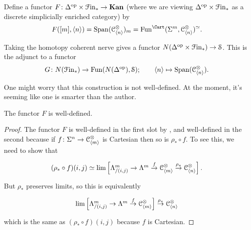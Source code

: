\documentclass[main.tex]{subfiles}
\begin{document}
\begin{definition}
  Define a functor $F\colon \Delta^{\mathrm{op}} \times \mathcal{F}\mathrm{in}_{*} \to \mathbf{Kan}$ (where we are viewing $\Delta^{\mathrm{op}} \times \mathcal{F}\mathrm{in}_{*}$ as a discrete simplicially enriched category) by
  \begin{equation*}
    F([m], \langle n \rangle) = \Span(\category{C}^{\otimes}_{\langle n \rangle})_{m} = \Fun^{\Cart}(\Sig^{m}, \category{C}^{\otimes}_{\langle n \rangle})^{\simeq}.
  \end{equation*}

  Taking the homotopy coherent nerve gives a functor $N(\Delta^{\mathrm{op}} \times \mathcal{F}\mathrm{in}_{*}) \to \mathcal{S}$. This is the adjunct to a functor
  \begin{equation*}
    G\colon N(\mathcal{F}\mathrm{in}_{*}) \to \mathrm{Fun}(N(\Delta^{\mathrm{op}}), \mathcal{S});\qquad \langle n \rangle \mapsto \mathrm{Span}(\mathcal{C}^{\otimes}_{\langle n \rangle}).
  \end{equation*}
\end{definition}

One might worry that this construction is not well-defined. At the moment, it's seeming like one is smarter than the author.

\begin{lemma}
  The functor $F$ is well-defined.
\end{lemma}
\begin{proof}
  The functor $F$ is well-defined in the first slot by \cite[Prop.~5.9]{1409.0837}, and well-defined in the second because if $f\colon \Sigma^{n} \to \mathcal{C}^{\otimes}_{\langle m \rangle}$ is Cartesian then so is $\rho_{*} \circ f$. To see this, we need to show that
  \begin{equation*}
    \begin{tikzcd}
      (\rho_{*} \circ f)(i, j) \simeq \lim\left[ \Lam^{m}_{/(i, j)} \to \Lam^{m} \overset{f}{\to} \category{C}^{\otimes}_{\langle m \rangle} \overset{\rho_{*}}{\to} \category{C}^{\otimes}_{\langle n \rangle} \right].
    \end{tikzcd}
  \end{equation*}
  But $\rho_{*}$ preserves limits, so this is equivalently
  \begin{equation*}
    \begin{tikzcd}
      \lim\left[ \Lam^{m}_{/(i, j)} \to \Lam^{m} \overset{f}{\to} \category{C}^{\otimes}_{\langle m \rangle} \right] \overset{\rho_{*}}{\to} \category{C}^{\otimes}_{\langle n \rangle}
    \end{tikzcd}
  \end{equation*}
  which is the same as $(\rho_{*} \circ f)(i,j)$ because $f$ is Cartesian.
\end{proof}
\end{document}
